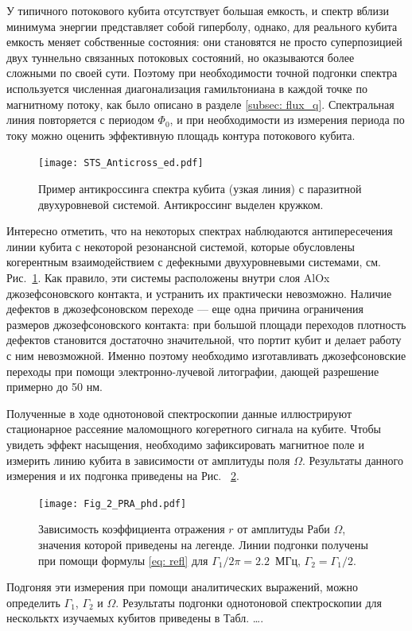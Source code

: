 У типичного потокового кубита отсутствует большая емкость, и спектр вблизи минимума энергии представляет собой гиперболу, однако, для реального кубита емкость меняет собственные состояния: они становятся не просто суперпозицией двух туннельно связанных потоковых состояний, но оказываются более сложными по своей сути. Поэтому при необходимости точной подгонки спектра используется численная диагонализация гамильтониана в каждой точке по магнитному потоку, как было описано в разделе \ref{subsec: flux_q}. Спектральная линия повторяется с периодом $\Phi_0$, и при необходимости из измерения периода по току можно оценить эффективную площадь контура потокового кубита. 

\begin{figure}[tbh]\centering
	\texttt{[image: STS\_Anticross\_ed.pdf]} \hfill
	\caption[Взаимодействие кубита с резонансной двухуровневой системой]{Пример антикроссинга спектра кубита (узкая линия) с паразитной двухуровневой системой. Антикроссинг выделен кружком.} 
	\label{img: anticross}
\end{figure}

Интересно отметить, что на некоторых спектрах наблюдаются антипересечения линии кубита с некоторой резонансной системой, которые обусловлены когерентным взаимодействием с дефекными двухуровневыми системами, см. Рис.~\ref{img: anticross}. Как правило, эти системы расположены внутри слоя AlOx джозефсоновского контакта, и устранить их практически невозможно. Наличие дефектов в джозефсоновском переходе --- еще одна причина ограничения размеров джозефсоновского контакта: при большой площади переходов плотность дефектов становится достаточно значительной, что портит кубит и делает работу с ним невозможной. Именно поэтому необходимо изготавливать джозефсоновские переходы при помощи электронно-лучевой литографии, дающей разрешение примерно до 50 нм. 

Полученные в ходе однотоновой спектроскопии данные иллюстрируют стационарное рассеяние маломощного когеретного сигнала на кубите. Чтобы увидеть эффект насыщения, необходимо зафиксировать магнитное поле и измерить линию кубита в зависимости от амплитуды поля $\Omega$. Результаты данного измерения и их подгонка приведены на Рис.~ \ref{img: power_line}. 
\begin{figure}
	\centering
	\texttt{[image: Fig\_2\_PRA\_phd.pdf]} \hfill
	\caption[Насыщение резонансной флуоресценции на кубите]{Зависимость коэффициента отражения $r$ от амплитуды Раби $\Omega$, значения которой приведены на легенде. Линии подгонки получены при помощи формулы \eqref{eq: refl} для $\Gamma_1/2\pi = 2.2$~МГц, $\Gamma_2=\Gamma_1/2$.}
	\label{img: power_line}
\end{figure}
Подгоняя эти измерения при помощи аналитических выражений, можно определить $\Gamma_1$, $\Gamma_2$ и $\Omega$. Результаты подгонки однотоновой спектроскопии для нескольктх изучаемых кубитов приведены в Табл. \ldots.



